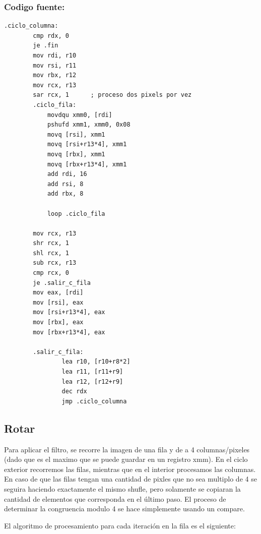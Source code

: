 \documentclass[a4paper]{article}
\newenvironment{codesnippet}{%
	\begin{Sbox}\begin{minipage}{\textwidth}\sffamily\small}%
	{\end{minipage}\end{Sbox}%
		\begin{center}%
		\vspace{-0.4cm}\colorbox{litegrey}{\TheSbox}\end{center}\vspace{0.3cm}}
\begin{document}
\clearpage
\subsubsection*{Codigo fuente:}
\begin{codesnippet}
\begin{internallinenumbers}
\begin{verbatim}
.ciclo_columna:
		cmp rdx, 0
		je .fin
		mov rdi, r10
		mov rsi, r11
		mov rbx, r12
		mov rcx, r13
		sar rcx, 1		; proceso dos pixels por vez
		.ciclo_fila:
			movdqu xmm0, [rdi]
			pshufd xmm1, xmm0, 0x08
			movq [rsi], xmm1
			movq [rsi+r13*4], xmm1
			movq [rbx], xmm1
			movq [rbx+r13*4], xmm1
			add rdi, 16
			add rsi, 8
			add rbx, 8
			
			loop .ciclo_fila
			
		mov rcx, r13
		shr rcx, 1
		shl rcx, 1
		sub rcx, r13
		cmp rcx, 0
		je .salir_c_fila
		mov eax, [rdi]
		mov [rsi], eax
		mov [rsi+r13*4], eax
		mov [rbx], eax
		mov [rbx+r13*4], eax
				
		.salir_c_fila:
				lea r10, [r10+r8*2]
				lea r11, [r11+r9]
				lea r12, [r12+r9]
				dec rdx
				jmp .ciclo_columna
\end{verbatim}
\end{internallinenumbers}
\end{codesnippet}

\clearpage
\subsection{Rotar}

Para aplicar el filtro, se recorre la imagen de una fila y de a 4 columnas/pixeles (dado que es el maximo que se puede guardar en un registro xmm). En el ciclo exterior recorremos las filas, mientras que en el interior procesamos las columnas. En caso de que las filas tengan una cantidad de pixles que no sea multiplo de 4 se seguira haciendo exactamente el mismo shufle, pero solamente se copiaran la cantidad de elementos que corresponda en el último paso. El proceso de determinar la congruencia modulo 4 se hace simplemente usando un compare.

El algoritmo de procesamiento para cada iteración en la fila es el siguiente:
\end{document}
